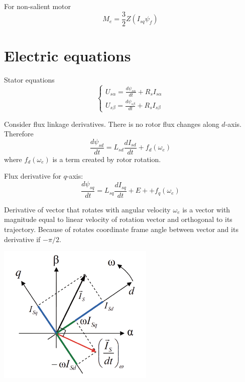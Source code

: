 \documentclass[11pt,a4paper,oneside]{report}
\begin{document}
For non-salient motor
\begin{equation}
	M_e=\frac{3}{2}Z(I_{sq}\psi_f)
\end{equation}

\section{Electric equations}

Stator equations
\begin{equation}
	\left\{
	\begin{split}
		U_{s\alpha} = \frac{d\psi_{s\alpha}}{dt}+R_sI_{s\alpha}\\
		U_{s\beta} = \frac{d\psi_{s\beta}}{dt}+R_sI_{s\beta}
	\end{split}
	\right.
\end{equation}

Consider flux linkage derivatives. There is no rotor flux changes along $d$-axis. Therefore
\begin{equation}
	\frac{d\psi_{sd}}{dt}=L_{sd}\frac{dI_{sd}}{dt}+f_d(\omega_e)
\end{equation}
where $f_d(\omega_e)$ is a term created by rotor rotation.

Flux derivative for $q$-axis:
\begin{equation}
	\frac{d\psi_{sq}}{dt}=L_{sq}\frac{dI_{sq}}{dt}+E++f_q(\omega_e)
\end{equation}

Derivative of vector that rotates with angular velocity $\omega_e$ is a vector with magnitude equal to linear velocity of rotation vector and orthogonal to its trajectory. Because of rotates coordinate frame angle between vector and its derivative if $-\pi/2$.

\begin{center}
	\includegraphics[scale=1]{vec_der}
\end{center}
\end{document}
